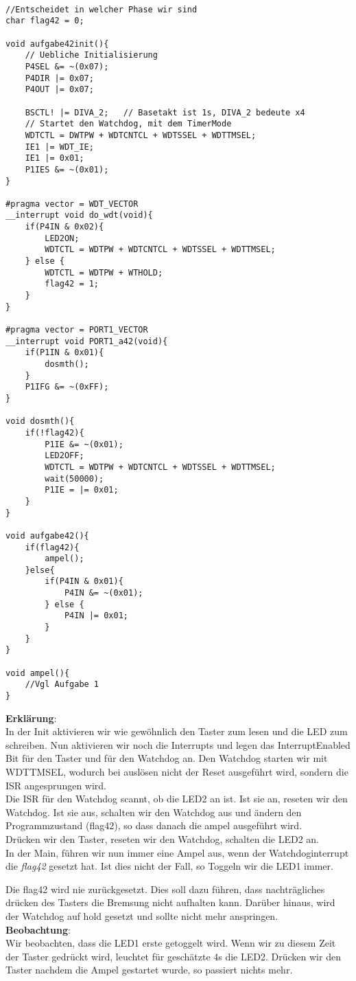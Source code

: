 \begin{lstlisting}

//Entscheidet in welcher Phase wir sind	
char flag42 = 0;

void aufgabe42init(){
	// Uebliche Initialisierung
	P4SEL &= ~(0x07);
	P4DIR |= 0x07;
	P4OUT |= 0x07;

	BSCTL! |= DIVA_2;	// Basetakt ist 1s, DIVA_2 bedeute x4
	// Startet den Watchdog, mit dem TimerMode
	WDTCTL = DWTPW + WDTCNTCL + WDTSSEL + WDTTMSEL;
	IE1 |= WDT_IE;
	IE1 |= 0x01;
	P1IES &= ~(0x01);
}

#pragma vector = WDT_VECTOR
__interrupt void do_wdt(void){
	if(P4IN & 0x02){
		LED2ON;
		WDTCTL = WDTPW + WDTCNTCL + WDTSSEL + WDTTMSEL;
	} else {
		WDTCTL = WDTPW + WTHOLD;
		flag42 = 1;
	}
}

#pragma vector = PORT1_VECTOR
__interrupt void PORT1_a42(void){
	if(P1IN & 0x01){
		dosmth();
	}
	P1IFG &= ~(0xFF);
}

void dosmth(){
	if(!flag42){
		P1IE &= ~(0x01);
		LED2OFF;
		WDTCTL = WDTPW + WDTCNTCL + WDTSSEL + WDTTMSEL;
		wait(50000);
		P1IE = |= 0x01;
	}
}

void aufgabe42(){
	if(flag42){
		ampel();
	}else{
		if(P4IN & 0x01){
			P4IN &= ~(0x01);
		} else {
			P4IN |= 0x01;
		}
	}
}

void ampel(){
	//Vgl Aufgabe 1
}

\end{lstlisting}

\textbf{Erklärung}:\\

In der Init aktivieren wir wie gewöhnlich den Taster zum lesen und die LED zum schreiben. Nun aktivieren wir noch die Interrupts und legen das InterruptEnabled Bit für den Taster und für den Watchdog an. Den Watchdog starten wir mit WDTTMSEL, wodurch bei auslösen nicht der Reset ausgeführt wird, sondern die ISR angesprungen wird.\\

Die ISR für den Watchdog scannt, ob die LED2 an ist. Ist sie an, reseten wir den Watchdog. Ist sie aus, schalten wir den Watchdog aus und ändern den Programmzustand (flag42), so dass danach die ampel ausgeführt wird.\\

Drücken wir den Taster, reseten wir den Watchdog, schalten die LED2 an.\\

In der Main, führen wir nun immer eine Ampel aus, wenn der Watchdoginterrupt die \emph{flag42} gesetzt hat. Ist dies nicht der Fall, so Toggeln wir die LED1 immer.

Die flag42 wird nie zurückgesetzt. Dies soll dazu führen, dass nachträgliches drücken des Tasters die Bremsung nicht aufhalten kann. Darüber hinaus, wird der Watchdog auf hold gesetzt und sollte nicht mehr anspringen.\\

\textbf{Beobachtung}:\\

Wir beobachten, dass die LED1 erste getoggelt wird. Wenn wir zu diesem Zeit der Taster gedrückt wird, leuchtet für geschätzte 4s die LED2. Drücken wir den Taster nachdem die Ampel gestartet wurde, so passiert nichts mehr.